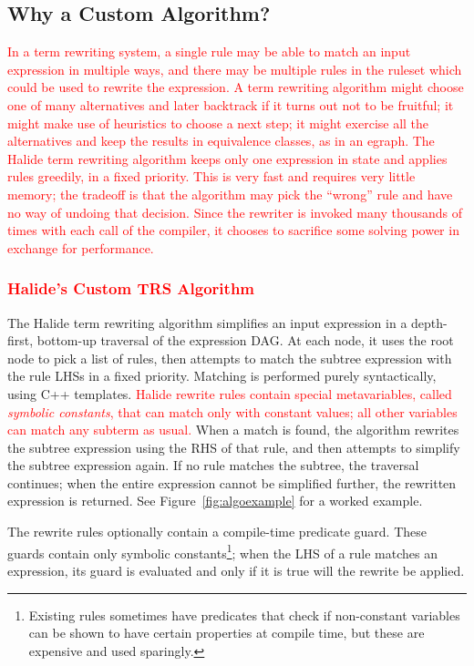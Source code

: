 \documentclass[acmsmall,review]{acmart}\settopmatter{printfolios=true,printccs=false,printacmref=false}
\newcommand{\modified}[1]{\textcolor{red}{{#1}}}
\begin{document}
\subsection{Why a Custom Algorithm?}
\label{sec:whycustom}

\modified{In a term rewriting system, a single rule may be able to match an input expression in 
multiple ways, and there may be multiple rules in the ruleset which could be used 
to rewrite the expression. A term rewriting algorithm might choose one of many alternatives 
and later backtrack if it turns out not to be fruitful; it might make use of 
heuristics to choose a next step; it might exercise all the alternatives and keep 
the results in equivalence classes, as in an egraph. The Halide term rewriting algorithm
keeps only one expression in state and applies rules greedily, in a fixed priority.
This is very fast and requires very little memory; the tradeoff is that the algorithm 
may pick the ``wrong'' rule and have no way of undoing that decision. 
Since the rewriter is invoked many thousands of times with each call of the compiler, 
it chooses to sacrifice some solving power in exchange for performance.}

\subsubsection{\modified{Halide's Custom TRS Algorithm}}
\label{sec:customalgo}
The Halide term rewriting algorithm simplifies an input expression in a
depth-first, bottom-up traversal of the expression DAG. At each node, it 
uses the root node to pick a list of rules, then
attempts to match the subtree expression with the rule LHSs in a fixed priority. Matching
is performed purely syntactically, using C++ templates.
 \modified{Halide rewrite rules contain special metavariables,
called \emph{symbolic constants}, that can match only with constant values; all other
variables can match any subterm as usual.}
When a match is found, the algorithm rewrites the
subtree expression using the RHS of that rule, and then attempts to simplify the
subtree expression again. If no rule matches the subtree, the traversal
continues; when the entire expression cannot be simplified further, the
rewritten expression is returned. See Figure~\ref{fig:algoexample} for a worked
example.

The rewrite rules optionally contain a compile-time predicate guard. 
These guards contain only symbolic constants\footnote{Existing 
rules sometimes have predicates that check if
  non-constant variables can be shown to have certain properties at compile
  time, but these are expensive and used sparingly.}; when the LHS of a rule
matches an expression, its guard is evaluated and only if it
is true will the rewrite be applied.
\end{document}
